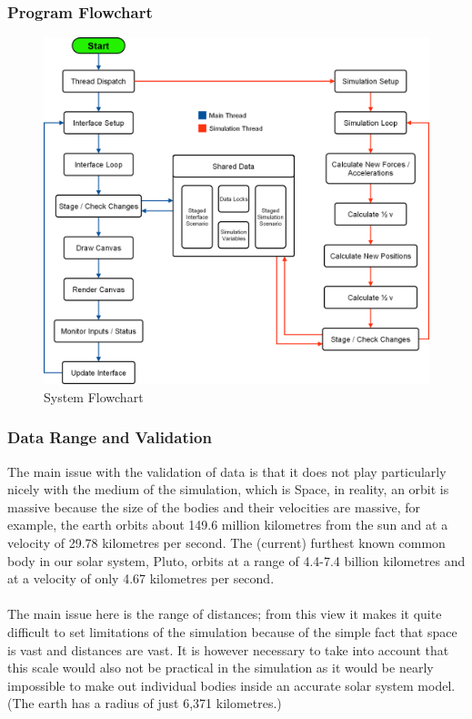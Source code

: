 \subsubsection{Program Flowchart}
\begin{figure}[!ht]
  \centering
  \includegraphics[width=\textwidth]{img/flowchart.png}
  \caption{System Flowchart}
\end{figure}

\pagebreak
\subsubsection{Data Range and Validation}
The main issue with the validation of data is that it does not play particularly nicely with the medium of the simulation, which is Space, in reality, an orbit is massive because the size of the bodies and their velocities are massive, for example, the earth orbits about 149.6 million kilometres from the sun and at a velocity of 29.78 kilometres per second. The (current) furthest known common body in our solar system, Pluto, orbits at a range of 4.4-7.4 billion kilometres and at a velocity of only 4.67 kilometres per second.

\paragraph{}
The main issue here is the range of distances; from this view it makes it quite difficult to set limitations of the simulation because of the simple fact that space is vast and distances are vast. It is however necessary to take into account that this scale would also not be practical in the simulation as it would be nearly impossible to make out individual bodies inside an accurate solar system model. (The earth has a radius of just 6,371 kilometres.)

